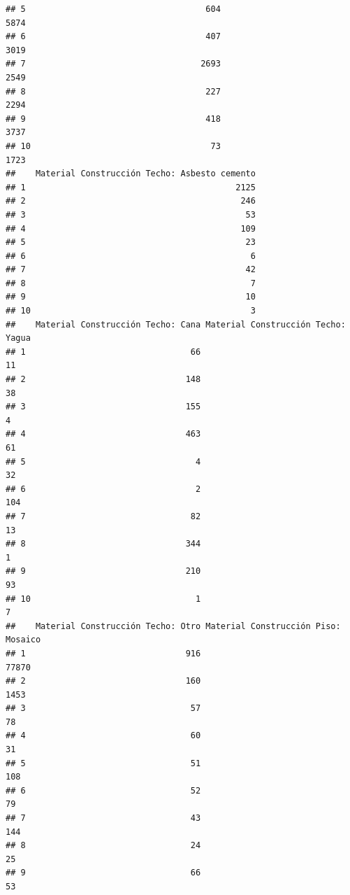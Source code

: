 \documentclass[11pt,]{article}
\begin{document}
\begin{verbatim}
## 5                                    604                              5874
## 6                                    407                              3019
## 7                                   2693                              2549
## 8                                    227                              2294
## 9                                    418                              3737
## 10                                    73                              1723
##    Material Construcción Techo: Asbesto cemento
## 1                                          2125
## 2                                           246
## 3                                            53
## 4                                           109
## 5                                            23
## 6                                             6
## 7                                            42
## 8                                             7
## 9                                            10
## 10                                            3
##    Material Construcción Techo: Cana Material Construcción Techo: Yagua
## 1                                 66                                 11
## 2                                148                                 38
## 3                                155                                  4
## 4                                463                                 61
## 5                                  4                                 32
## 6                                  2                                104
## 7                                 82                                 13
## 8                                344                                  1
## 9                                210                                 93
## 10                                 1                                  7
##    Material Construcción Techo: Otro Material Construcción Piso: Mosaico
## 1                                916                               77870
## 2                                160                                1453
## 3                                 57                                  78
## 4                                 60                                  31
## 5                                 51                                 108
## 6                                 52                                  79
## 7                                 43                                 144
## 8                                 24                                  25
## 9                                 66                                  53

\end{verbatim}
\end{document}
